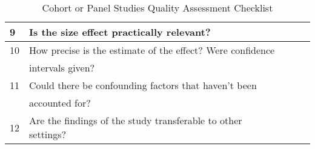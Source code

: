 \begin{table}[H]
\begin{center}
{\begin{tabular}{|l||l|l|l|l|}
                        \hline  
                        9  & Is the size effect practically relevant?                         &&& \\
                        \hline  
                        10 & How precise is the estimate of the effect? Were confidence       &&& \\
                           & intervals given?                                                 &&& \\
                        \hline  
                        11 & Could there be confounding factors that haven’t been             &&& \\
                           & accounted for?                                                   &&& \\
                        \hline
                        12 & Are the findings of the study transferable to other settings?    &&& \\
                        \hline
                \end{tabular}}
        \end{center}
        \caption{Cohort or Panel Studies Quality Assessment Checklist}
        \label{table:cohortStudy}
\end{table}


